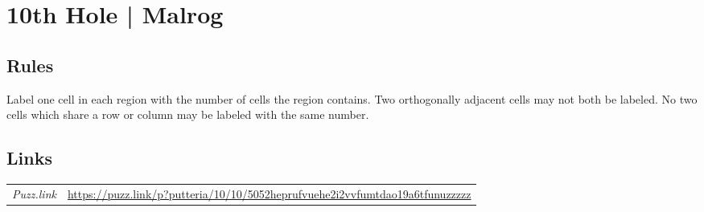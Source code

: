 \section[10th Hole | Malrog {[\emph{Putteria}]}]{10th Hole | {\normalfont Malrog}}
\label{sec:05-10th-hole-malrog}

\subsection*{Rules}
\begin{markdown}
Label one cell in each region with the number of cells the region contains. Two orthogonally adjacent cells may not both be labeled. No two cells which share a row or column may be labeled with the same number.
\end{markdown}
\subsection*{Links}
\begin{tabularx}{\textwidth}{l X}
\emph{Puzz.link} & \url{https://puzz.link/p?putteria/10/10/5052heprufvuehe2i2vvfumtdao19a6tfunuzzzzz} \\
\end{tabularx}
\pagebreak
